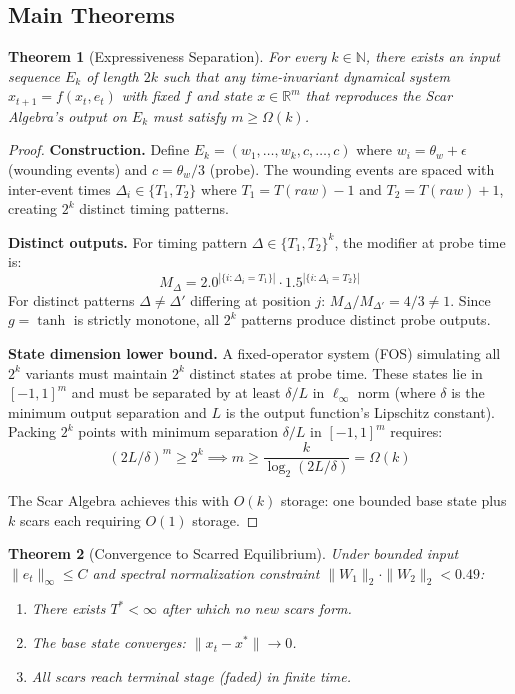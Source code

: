\documentclass[11pt]{article}
\newtheorem{theorem}{Theorem}[section]
\begin{document}
\subsection{Main Theorems}

\begin{theorem}[Expressiveness Separation]
\label{thm:scar-expressiveness}
For every $k \in \mathbb{N}$, there exists an input sequence $E_k$ of length $2k$ such that any time-invariant dynamical system $x_{t+1} = f(x_t, e_t)$ with fixed $f$ and state $x \in \mathbb{R}^m$ that reproduces the Scar Algebra's output on $E_k$ must satisfy $m \geq \Omega(k)$.
\end{theorem}

\begin{proof}
\textbf{Construction.} Define $E_k = (w_1, \ldots, w_k, c, \ldots, c)$ where $w_i = \theta_w + \epsilon$ (wounding events) and $c = \theta_w/3$ (probe). The wounding events are spaced with inter-event times $\Delta_i \in \{T_1, T_2\}$ where $T_1 = T(raw) - 1$ and $T_2 = T(raw) + 1$, creating $2^k$ distinct timing patterns.

\textbf{Distinct outputs.} For timing pattern $\Delta \in \{T_1, T_2\}^k$, the modifier at probe time is:
\begin{equation}
M_\Delta = 2.0^{|\{i: \Delta_i = T_1\}|} \cdot 1.5^{|\{i: \Delta_i = T_2\}|}
\end{equation}
For distinct patterns $\Delta \neq \Delta'$ differing at position $j$: $M_\Delta / M_{\Delta'} = 4/3 \neq 1$. Since $g = \tanh$ is strictly monotone, all $2^k$ patterns produce distinct probe outputs.

\textbf{State dimension lower bound.} A fixed-operator system (FOS) simulating all $2^k$ variants must maintain $2^k$ distinct states at probe time. These states lie in $[-1,1]^m$ and must be separated by at least $\delta/L$ in $\ell_\infty$ norm (where $\delta$ is the minimum output separation and $L$ is the output function's Lipschitz constant). Packing $2^k$ points with minimum separation $\delta/L$ in $[-1,1]^m$ requires:
\begin{equation}
(2L/\delta)^m \geq 2^k \implies m \geq \frac{k}{\log_2(2L/\delta)} = \Omega(k)
\end{equation}

The Scar Algebra achieves this with $O(k)$ storage: one bounded base state plus $k$ scars each requiring $O(1)$ storage.
\end{proof}

\begin{theorem}[Convergence to Scarred Equilibrium]
\label{thm:scar-convergence}
Under bounded input $\|e_t\|_\infty \leq C$ and spectral normalization constraint $\|W_1\|_2 \cdot \|W_2\|_2 < 0.49$:
\begin{enumerate}[label=(\alph*)]
\item There exists $T^* < \infty$ after which no new scars form.
\item The base state converges: $\|x_t - x^*\| \to 0$.
\item All scars reach terminal stage (faded) in finite time.
\end{enumerate}
\end{theorem}
\end{document}
